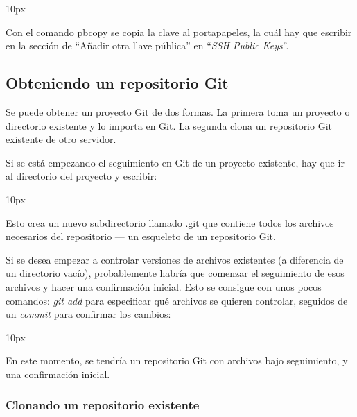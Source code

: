 \begin{center}{
	\fboxsep 10px
}
\end{center}

Con el comando pbcopy se copia la clave al portapapeles, la cuál hay que escribir en la sección de ``Añadir otra llave pública'' en ``{\it SSH Public Keys}''.

%
%
\subsection{Obteniendo un repositorio Git}

Se puede obtener un proyecto Git de dos formas. La primera toma un proyecto o directorio existente y lo importa en Git. La segunda clona un repositorio Git existente de otro servidor.

Si se está empezando el seguimiento en Git de un proyecto existente, hay que ir al directorio del proyecto y escribir:

\begin{center}{
	\fboxsep 10px
	}
\end{center}

Esto crea un nuevo subdirectorio llamado .git que contiene todos los archivos necesarios del repositorio --- un esqueleto de un repositorio Git.

Si se desea empezar a controlar versiones de archivos existentes (a diferencia de un directorio vacío), probablemente habría que comenzar el seguimiento de esos archivos y hacer una confirmación inicial. Esto se consigue con unos pocos comandos: {\it git add} para especificar qué archivos se quieren controlar, seguidos de un {\it commit} para confirmar los cambios:

\begin{center}{
	\fboxsep 10px
	}
\end{center}

En este momento, se tendría un repositorio Git con archivos bajo seguimiento, y una confirmación inicial.

\subsubsection{Clonando un repositorio existente}

